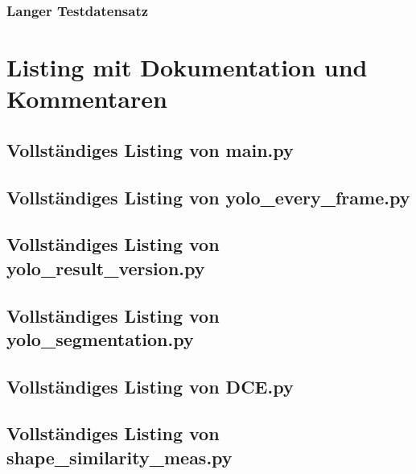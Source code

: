 {{    }
    \subsubsection{Langer Testdatensatz}{
          

    }

}
\section{Listing mit Dokumentation und Kommentaren}{\label{cd:gesamt_listing}}





\subsection{Vollständiges Listing von main.py}{
    }

\subsection{Vollständiges Listing von yolo\_every\_frame.py}{
    }

\subsection{Vollständiges Listing von yolo\_result\_version.py}{
    }

\subsection{Vollständiges Listing von yolo\_segmentation.py}{
    }

\subsection{Vollständiges Listing von DCE.py}{
    }

\subsection{ Vollständiges Listing von shape\_similarity\_meas.py}{
    
}

